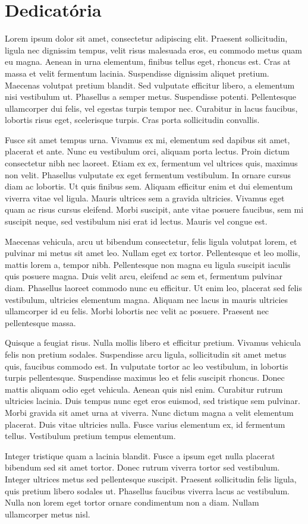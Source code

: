 \chapter{Dedicatória}
\label{chap:dedicatoria}

Lorem ipsum dolor sit amet, consectetur adipiscing elit. Praesent sollicitudin, ligula nec dignissim tempus, velit risus malesuada eros, eu commodo metus quam eu magna. Aenean in urna elementum, finibus tellus eget, rhoncus est. Cras at massa et velit fermentum lacinia. Suspendisse dignissim aliquet pretium. Maecenas volutpat pretium blandit. Sed vulputate efficitur libero, a elementum nisi vestibulum ut. Phasellus a semper metus. Suspendisse potenti. Pellentesque ullamcorper dui felis, vel egestas turpis tempor nec. Curabitur in lacus faucibus, lobortis risus eget, scelerisque turpis. Cras porta sollicitudin convallis.

Fusce sit amet tempus urna. Vivamus ex mi, elementum sed dapibus sit amet, placerat et ante. Nunc eu vestibulum orci, aliquam porta lectus. Proin dictum consectetur nibh nec laoreet. Etiam ex ex, fermentum vel ultrices quis, maximus non velit. Phasellus vulputate ex eget fermentum vestibulum. In ornare cursus diam ac lobortis. Ut quis finibus sem. Aliquam efficitur enim et dui elementum viverra vitae vel ligula. Mauris ultrices sem a gravida ultricies. Vivamus eget quam ac risus cursus eleifend. Morbi suscipit, ante vitae posuere faucibus, sem mi suscipit neque, sed vestibulum nisi erat id lectus. Mauris vel congue est.

Maecenas vehicula, arcu ut bibendum consectetur, felis ligula volutpat lorem, et pulvinar mi metus sit amet leo. Nullam eget ex tortor. Pellentesque et leo mollis, mattis lorem a, tempor nibh. Pellentesque non magna eu ligula suscipit iaculis quis posuere magna. Duis velit arcu, eleifend ac sem et, fermentum pulvinar diam. Phasellus laoreet commodo nunc eu efficitur. Ut enim leo, placerat sed felis vestibulum, ultricies elementum magna. Aliquam nec lacus in mauris ultricies ullamcorper id eu felis. Morbi lobortis nec velit ac posuere. Praesent nec pellentesque massa.

Quisque a feugiat risus. Nulla mollis libero et efficitur pretium. Vivamus vehicula felis non pretium sodales. Suspendisse arcu ligula, sollicitudin sit amet metus quis, faucibus commodo est. In vulputate tortor ac leo vestibulum, in lobortis turpis pellentesque. Suspendisse maximus leo et felis suscipit rhoncus. Donec mattis aliquam odio eget vehicula. Aenean quis nisl enim. Curabitur rutrum ultricies lacinia. Duis tempus nunc eget eros euismod, sed tristique sem pulvinar. Morbi gravida sit amet urna at viverra. Nunc dictum magna a velit elementum placerat. Duis vitae ultricies nulla. Fusce varius elementum ex, id fermentum tellus. Vestibulum pretium tempus elementum.

Integer tristique quam a lacinia blandit. Fusce a ipsum eget nulla placerat bibendum sed sit amet tortor. Donec rutrum viverra tortor sed vestibulum. Integer ultrices metus sed pellentesque suscipit. Praesent sollicitudin felis ligula, quis pretium libero sodales ut. Phasellus faucibus viverra lacus ac vestibulum. Nulla non lorem eget tortor ornare condimentum non a diam. Nullam ullamcorper metus nisl. 
